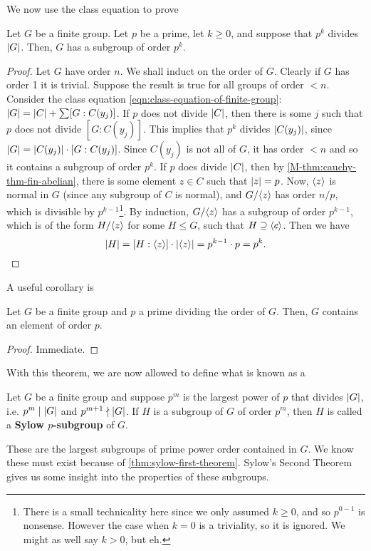 \documentclass[./main.tex]{subfiles}
\begin{document}
We now use the class equation to prove
\begin{theorem}
\label{thm:sylow-first-theorem}
    Let $G$ be a finite group. Let $p$ be a prime, let $k \geq 0$, and suppose
    that $p^k$ divides $\abs G$. Then, $G$ has a subgroup of order $p^k$.
\end{theorem}
\begin{proof}
    Let $G$ have order $n$. We shall induct on the order of $G$. Clearly if $G$
    has order 1 it is trivial. Suppose the result is true for all groups of
    order $<n$. Consider the class equation
    \cref{eqn:class-equation-of-finite-group}: $\abs G = \abs C + \sum
    [G:C(y_j)]$. If $p$ does not divide $\abs C$, then there is some $j$ such
    that $p$ does not divide $[G:C(y_j)]$. This implies that $p^k$ divides
    $\abs{C(y_j)}$, since $\abs G = \abs{C(y_j)} \cdot [G:C(y_j)]$. Since
    $C(y_j)$ is not all of $G$, it has order $<n$ and so it contains a subgroup
    of order $p^k$. If $p$ does divide $\abs C$, then by
    \cref{M-thm:cauchy-thm-fin-abelian}, there is some element $z \in C$ such that
    $\abs z = p$. Now, ${ \langle z \rangle }$ is normal in $G$ (since any subgroup of $C$ is
    normal), and $G/{ \langle z \rangle }$ has order $n/p$, which is divisible by
    $p^{k-1}$\footnote{There is a small technicality here since we only assumed
    $k \geq 0$, and so $p^{0-1}$ is nonsense. However the case when $k = 0$ is a
    triviality, so it is ignored. We might as well say $k > 0$, but eh.}. By
    induction, $G/{ \langle z \rangle }$ has a subgroup of order $p^{k-1}$, which is of the
    form $H/{ \langle z \rangle }$ for some $H \leq G$, such that $H \supseteq { \langle c \rangle }$. Then we
    have
    \[
        \abs H = [H : \gen z] \cdot \abs{\gen z} = p^{k-1} \cdot p = p^k.
    \]
\end{proof}

A useful corollary is 
\begin{corollary}
\label{cor:cauchy-thm-finite-groups}
    Let $G$ be a finite group and $p$ a prime dividing the order of $G$. Then,
    $G$ contains an element of order $p$.
\end{corollary}
\begin{proof}
    Immediate.
\end{proof}

With this theorem, we are now allowed to define what is known as a
\begin{definition}
\label{def:sylow-subgroup}
    Let $G$ be a finite group and suppose $p^m$ is the largest power of $p$ that
    divides $\abs G$, i.e. $p^m \mid \abs G$ and $p^{m+1} \nmid \abs G$. If $H$
    is a subgroup of $G$ of order $p^m$, then $H$ is called a \textbf{Sylow
    $p$-subgroup} of $G$.
\end{definition}
These are the largest subgroups of prime power order contained in $G$. We know
these must exist because of \cref{thm:sylow-first-theorem}. Sylow's Second
Theorem gives us some insight into the properties of these subgroups.
\end{document}
